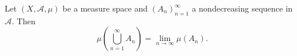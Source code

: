 Let $(X, \mathcal{A}, \mu)$ be a measure space and $(A_n)_{n=1}^{\infty}$ a nondecreasing sequence in $\mathcal{A}$. Then
$$\mu\left(\bigcup_{n=1}^{\infty} A_n\right) = \lim_{n \to \infty} \mu(A_n).$$